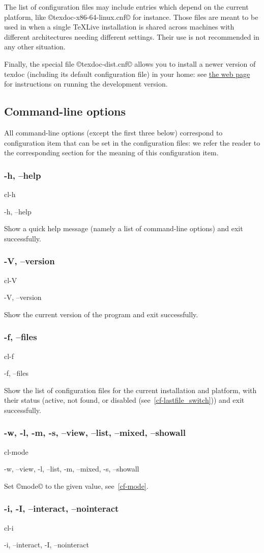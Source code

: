 \documentclass[a4paper, oneside]{scrartcl}
\newcommand\texlive{%
  \TeX\thinspace Live\xspace}
\newif\ifframed
\newenvironment{cmdsubsub}[2]{%
  \framedfalse \commandes\subsubsection{#1}{#2}%
  }{%
  \endcommandes}
\begin{document}
The list of configuration files may include entries which depend on the
current platform, like ©texdoc-x86-64-linux.cnf© for instance. Those files are
meant to be used in when a single \texlive installation is shared across
machines with different architectures needing different settings. Their use is
not recommended in any other situation.

Finally, the special file ©texdoc-dist.cnf© allows you to install a newer
version of texdoc (including its default configuration file) in your home:
see \href{http://tug.org/texdoc/dev/}{the web page} for instructions on
running the development version.

\subsection{Command-line options}\label{ss-cl}

All command-line options (except the first three below) correspond to
configuration item that can be set in the configuration files: we refer
the reader to the corresponding section for the meaning of this configuration
item.

\begin{cmdsubsub}{-h, --help}{cl-h}
  -h, --help
\end{cmdsubsub}

Show a quick help message (namely a list of command-line options) and exit
successfully.

\begin{cmdsubsub}{-V, --version}{cl-V}
  -V, --version
\end{cmdsubsub}

Show the current version of the program and exit successfully.

\begin{cmdsubsub}{-f, --files}{cl-f}
  -f, --files
\end{cmdsubsub}

Show the list of configuration files for the current installation and
platform, with their status (active, not found, or disabled
(see~\ref{cf-lastfile_switch})) and exit successfully.

\begin{cmdsubsub}{-w, -l, -m, -s, --view, --list, --mixed, --showall}{cl-mode}
  -w, --view, -l, --list, -m, --mixed, -s, --showall
\end{cmdsubsub}

Set ©mode© to the given value, see~\ref{cf-mode}.

\begin{cmdsubsub}{-i, -I, --interact, --nointeract}{cl-i}
  -i, --interact, -I, --nointeract
\end{cmdsubsub}
\end{document}
